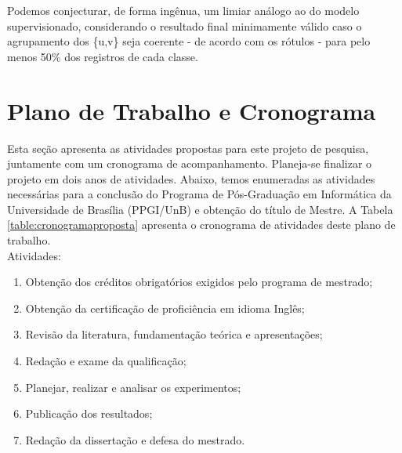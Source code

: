 Podemos conjecturar, de forma ingênua, um limiar análogo ao do modelo supervisionado, considerando o resultado final minimamente válido caso o agrupamento dos \{u,v\} seja coerente - de acordo com os rótulos - para pelo menos 50\% dos registros de cada classe.


\section{Plano de Trabalho e Cronograma}

Esta seção apresenta as atividades propostas para este projeto de pesquisa, juntamente com um cronograma de acompanhamento. Planeja-se finalizar o projeto em dois anos de atividades. Abaixo, temos enumeradas as atividades necessárias para a conclusão do Programa de Pós-Graduação em Informática da Universidade de Brasília (PPGI/UnB) e obtenção do título de Mestre. A Tabela \ref{table:cronogramaproposta} apresenta o cronograma de atividades deste plano de trabalho.\\

Atividades:

\begin{enumerate}
    \item Obtenção dos créditos obrigatórios exigidos pelo programa de mestrado;
    \item Obtenção da certificação de proficiência em idioma Inglês;
    \item Revisão da literatura, fundamentação teórica e apresentações;
    \item Redação e exame da qualificação;
    \item Planejar, realizar e analisar os experimentos;
    \item Publicação dos resultados;
    \item Redação da dissertação e defesa do mestrado.
\end{enumerate}

